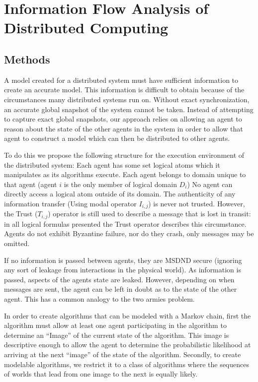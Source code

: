 

\chapter{Information Flow Analysis of Distributed Computing}


\section{Methods}

A model created for a distributed system must have sufficient information to create an accurate model. This information is difficult to obtain because of the circumstances many distributed systems run on. Without exact synchronization, an accurate global snapshot of the system cannot be taken. Instead of attempting to capture exact global snapshots, our approach relies on allowing an agent to reason about the state of the other agents in the system in order to allow that agent to construct a model which can then be distributed to other agents.


To do this we propose the following structure for the execution environment of the distributed system:
Each agent has some set logical atoms which it manipulates as its algorithms execute.
Each agent belongs to domain unique to that agent (agent $i$ is the only member of logical domain $D_i$)
No agent can directly access a logical atom outside of its domain.
The authenticity of any information transfer (Using modal operator $I_{i,j}$) is never not trusted. However, the Trust ($T_{i,j}$) operator is still used to describe a message that is lost in transit: in all logical formulas presented the Trust operator describes this circumstance.
Agents do not exhibit Byzantine failure, nor do they crash, only messages may be omitted.

If no information is passed between agents, they are MSDND secure (ignoring any sort of leakage from interactions in the physical world). As information is passed, aspects of the agents state are leaked. However, depending on when messages are sent, the agent can be left in doubt as to the state of the other agent. This has a common analogy to the two armies problem. 

In order to create algorithms that can be modeled with a Markov chain, first the algorithm must allow at least one agent participating in the algorithm to determine an ``Image'' of the current state of the algorithm. This image is descriptive enough to allow the agent to determine the probabilistic likelihood at arriving at the next ``image'' of the state of the algorithm. Secondly, to create modelable algorithms, we restrict it to a class of algorithms where the sequences of worlds that lead from one image to the next is equally likely.

